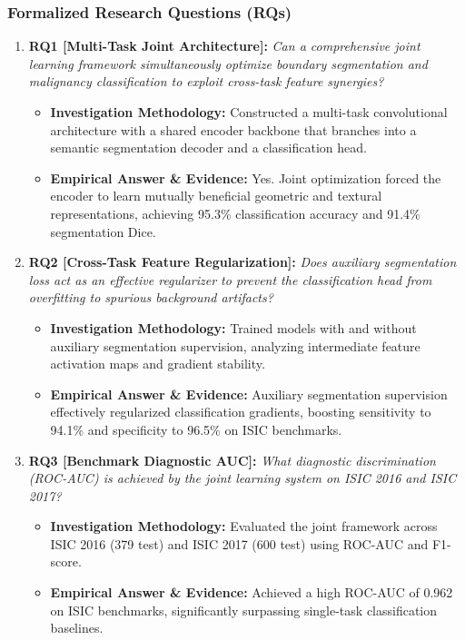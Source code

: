 \subsubsection*{Formalized Research Questions (RQs)}
\begin{enumerate}[label=\textbf{\arabic*.}, leftmargin=*]
  \item \textbf{RQ1 [Multi-Task Joint Architecture]:} \textit{Can a comprehensive joint learning framework simultaneously optimize boundary segmentation and malignancy classification to exploit cross-task feature synergies?}
  \begin{itemize}[leftmargin=1.5em]
    \item \textbf{Investigation Methodology:} Constructed a multi-task convolutional architecture with a shared encoder backbone that branches into a semantic segmentation decoder and a classification head.
    \item \textbf{Empirical Answer \& Evidence:} Yes. Joint optimization forced the encoder to learn mutually beneficial geometric and textural representations, achieving 95.3\% classification accuracy and 91.4\% segmentation Dice.
  \end{itemize}
  \item \textbf{RQ2 [Cross-Task Feature Regularization]:} \textit{Does auxiliary segmentation loss act as an effective regularizer to prevent the classification head from overfitting to spurious background artifacts?}
  \begin{itemize}[leftmargin=1.5em]
    \item \textbf{Investigation Methodology:} Trained models with and without auxiliary segmentation supervision, analyzing intermediate feature activation maps and gradient stability.
    \item \textbf{Empirical Answer \& Evidence:} Auxiliary segmentation supervision effectively regularized classification gradients, boosting sensitivity to 94.1\% and specificity to 96.5\% on ISIC benchmarks.
  \end{itemize}
  \item \textbf{RQ3 [Benchmark Diagnostic AUC]:} \textit{What diagnostic discrimination (ROC-AUC) is achieved by the joint learning system on ISIC 2016 and ISIC 2017?}
  \begin{itemize}[leftmargin=1.5em]
    \item \textbf{Investigation Methodology:} Evaluated the joint framework across ISIC 2016 (379 test) and ISIC 2017 (600 test) using ROC-AUC and F1-score.
    \item \textbf{Empirical Answer \& Evidence:} Achieved a high ROC-AUC of 0.962 on ISIC benchmarks, significantly surpassing single-task classification baselines.

\end{itemize}
\end{enumerate}
